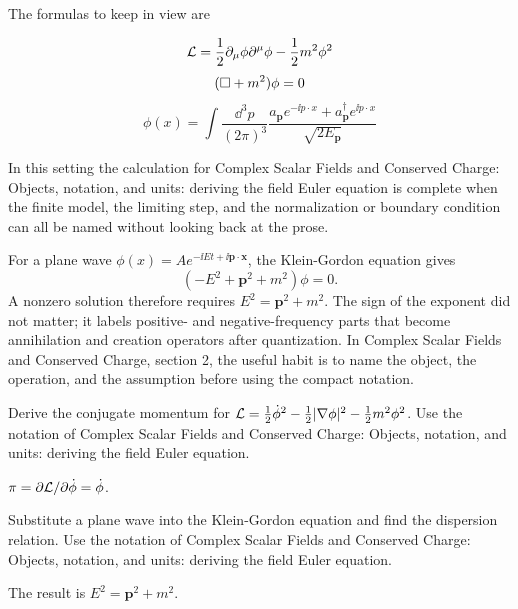 The formulas to keep in view are

\[
  \mathcal L=\frac12\partial_\mu\phi\partial^\mu\phi-\frac12m^2\phi^2
\]
\[
  (\Box+m^2)\phi=0
\]
\[
  \phi(x)=\int\frac{\dd^3p}{(2\pi)^3}\frac{a_{\bm p}e^{-\ii p\cdot x}+a_{\bm p}^\dagger e^{\ii p\cdot x}}{\sqrt{2E_{\bm p}}}
\]

In this setting the calculation for Complex Scalar Fields and Conserved Charge: Objects, notation, and units: deriving the field Euler equation is complete when the finite model, the limiting step, and the normalization or boundary condition can all be named without looking back at the prose.




\begin{example}
For a plane wave \(\phi(x)=Ae^{-\ii Et+\ii\bm p\cdot\bm x}\), the Klein-Gordon equation gives
\[
  (-E^2+\bm p^2+m^2)\phi=0.
\]
A nonzero solution therefore requires \(E^2=\bm p^2+m^2\).  The sign of the exponent did not matter; it labels positive- and negative-frequency parts that become annihilation and creation operators after quantization.  In Complex Scalar Fields and Conserved Charge, section 2, the useful habit is to name the object, the operation, and the assumption before using the compact notation.
\end{example}



\begin{exercise}
Derive the conjugate momentum for \(\mathcal L=\frac12\dot\phi^2-\frac12|\nabla\phi|^2-\frac12m^2\phi^2\).  Use the notation of Complex Scalar Fields and Conserved Charge: Objects, notation, and units: deriving the field Euler equation.
\begin{answer}
\(\pi=\partial\mathcal L/\partial\dot\phi=\dot\phi\).
\end{answer}
\end{exercise}

\begin{exercise}
Substitute a plane wave into the Klein-Gordon equation and find the dispersion relation.  Use the notation of Complex Scalar Fields and Conserved Charge: Objects, notation, and units: deriving the field Euler equation.
\begin{answer}
The result is \(E^2=\bm p^2+m^2\).
\end{answer}
\end{exercise}



